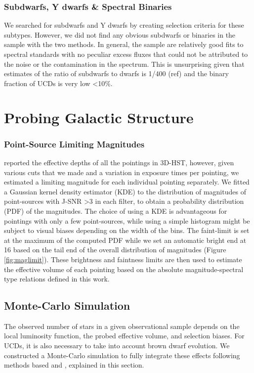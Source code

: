 \documentclass[manuscript]{aastex63}
\begin{document}
\subsubsection{ Subdwarfs, Y dwarfs  \& Spectral Binaries}
We searched for subdwarfs and Y dwarfs by creating selection criteria for these subtypes. However, we did not find any obvious subdwarfs or binaries in the sample with the two methods. In general, the sample are relatively good fits to spectral standards with no peculiar excess fluxes that could not be attributed to the noise or the contamination in the spectrum. This is unsurprising given that estimates of the ratio of subdwarfs to dwarfs is 1/400 (ref) and the binary fraction of UCDs is very low \textless 10\%. 


\section{Probing Galactic Structure}\label{sec:simulations}

\subsubsection{ Point-Source Limiting Magnitudes}
\citealt{Momcheva2016} reported the effective depths of all the pointings in 3D-HST, however, given various cuts that we made and a variation in exposure times per pointing, we estimated a limiting magnitude for each individual pointing separately. We fitted a Gaussian kernel density estimator (KDE) to the distribution of magnitudes of point-sources with J-SNR \textgreater 3 in each filter, to obtain a probability distribution (PDF) of the magnitudes. The choice of using a KDE is advantageous for pointings with only a few point-sources, while using a simple histogram might be subject to visual biases depending on the width of the bins. The faint-limit is set at the maximum of the computed PDF while we set an automatic bright end at 16 based on the tail end of the overall distribution of magnitudes (Figure \ref{fig:maglimit}). These brightness and faintness limits are then used to estimate the effective volume of each pointing based on the absolute magnitude-spectral type relations defined in this work. 

\subsection{Monte-Carlo Simulation}
The observed number of stars in a given observational sample depends on the local luminosity function, the probed effective volume, and selection biases. For UCDs, it is also necessary to take into account brown dwarf evolution. We constructed a Monte-Carlo simulation to fully integrate these effects following methods based \cite{1999ApJ...521..613R} and \cite{2004ApJS..155..191B}, explained in this section.
\end{document}
